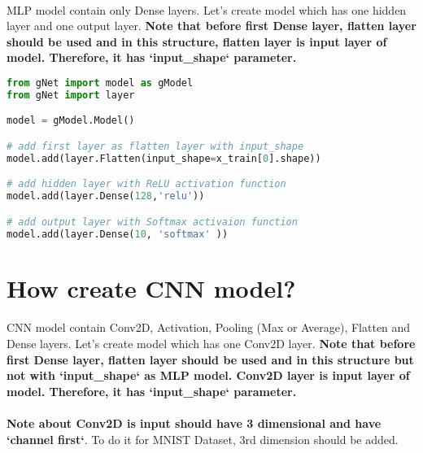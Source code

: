 \documentclass[12pt]{report}
\begin{document}
\paragraph{}
MLP model contain only Dense layers. Let's create model which has one hidden layer and one output layer. \textbf{Note that before first Dense layer, flatten layer should be used and in this structure, flatten layer is input layer of model. Therefore, it has `input\_shape` parameter.}


\begin{lstlisting}[language=Python, numbers=none, caption={Create MLP model.}, label={ex:create-mlp-model}]
from gNet import model as gModel
from gNet import layer

model = gModel.Model()

# add first layer as flatten layer with input_shape
model.add(layer.Flatten(input_shape=x_train[0].shape))

# add hidden layer with ReLU activation function
model.add(layer.Dense(128,'relu'))

# add output layer with Softmax activaion function 
model.add(layer.Dense(10, 'softmax' ))
\end{lstlisting}



\section{How create CNN model?}
\paragraph{}
CNN model contain Conv2D, Activation, Pooling (Max or Average), Flatten and Dense layers. Let's create model which has one Conv2D layer. \textbf{Note that before first Dense layer, flatten layer should be used and in this structure but not with `input\_shape` as MLP model. Conv2D layer is input layer of model. Therefore, it has `input\_shape` parameter.}

\paragraph{}
\textbf{Note about Conv2D is input should have 3 dimensional and have `channel first`}. To do it for MNIST Dataset, 3rd dimension should be added.
\end{document}
